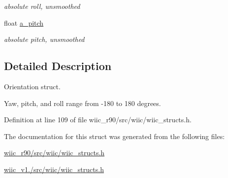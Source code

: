 \begin{DoxyCompactItemize}
\begin{DoxyCompactList}\small\item\em absolute roll, unsmoothed \end{DoxyCompactList}\item 
\hypertarget{structorient__t_a371dcce2c704ad989a0aa66e6fc38fbd}{float \hyperlink{structorient__t_a371dcce2c704ad989a0aa66e6fc38fbd}{a\-\_\-pitch}}\label{structorient__t_a371dcce2c704ad989a0aa66e6fc38fbd}

\begin{DoxyCompactList}\small\item\em absolute pitch, unsmoothed \end{DoxyCompactList}\end{DoxyCompactItemize}


\subsection{Detailed Description}
Orientation struct. 

Yaw, pitch, and roll range from -\/180 to 180 degrees. 

Definition at line 109 of file wiic\-\_\-r90/src/wiic/wiic\-\_\-structs.\-h.



The documentation for this struct was generated from the following files\-:\begin{DoxyCompactItemize}
\item 
\hyperlink{wiic__r90_2src_2wiic_2wiic__structs_8h}{wiic\-\_\-r90/src/wiic/wiic\-\_\-structs.\-h}\item 
\hyperlink{wiic__v1_81_2src_2wiic_2wiic__structs_8h}{wiic\-\_\-v1./src/wiic/wiic\-\_\-structs.\-h}\end{DoxyCompactItemize}
